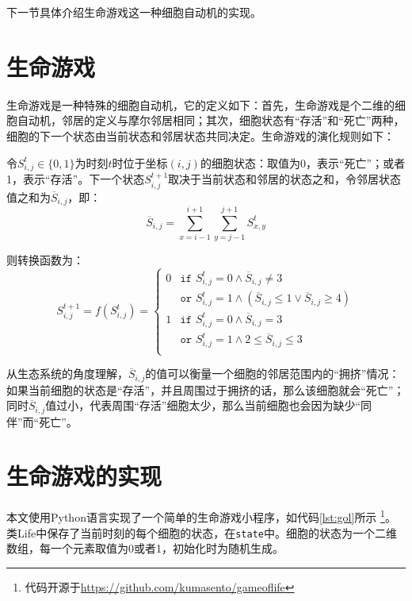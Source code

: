 \documentclass[a4paper,12pt]{report}
\begin{document}
下一节具体介绍生命游戏这一种细胞自动机的实现。

\section{生命游戏}\label{sec:gol}

生命游戏是一种特殊的细胞自动机，它的定义如下：首先，生命游戏是个二维的细胞自动机，邻居的定义与摩尔邻居相同；其次，细胞状态有“存活”和“死亡”两种，细胞的下一个状态由当前状态和邻居状态共同决定。生命游戏的演化规则如下：

令$S_{i,j}^t \in \{ 0, 1 \}$为时刻$t$时位于坐标$(i,j)$的细胞状态：取值为0，表示“死亡”；或者1，表示“存活”。下一个状态$S_{i,j}^{t+1}$取决于当前状态和邻居的状态之和，令邻居状态值之和为$\overline{S}_{i,j}$，即：
$$
\overline{S}_{i,j} = \sum_{x=i-1}^{i+1} \sum_{y=j-1}^{j+1} S_{x,y}^t 
$$

则转换函数为：
\begin{equation}\label{eq:mapping}
S_{i,j}^{t+1} = f(S_{i,j}^t) = 
\begin{cases}
0 & \texttt{if } S_{i,j}^t = 0 \wedge  \overline{S}_{i,j} \neq 3 \\
  & \texttt{or } S_{i,j}^t = 1 \wedge (\overline{S}_{i,j} \leq 1 \vee \overline{S}_{i,j} \geq 4) \\
1 & \texttt{if } S_{i,j}^t = 0 \wedge \overline{S}_{i,j} = 3 \\
  & \texttt{or } S_{i,j}^t = 1 \wedge 2 \leq \overline{S}_{i,j} \leq 3 \\
\end{cases}
\end{equation}

从生态系统的角度理解，$\overline{S}_{i,j}$的值可以衡量一个细胞的邻居范围内的“拥挤”情况：如果当前细胞的状态是“存活”，并且周围过于拥挤的话，那么该细胞就会“死亡”；同时$\overline{S}_{i,j}$值过小，代表周围“存活”细胞太少，那么当前细胞也会因为缺少“同伴”而“死亡”。

\section{生命游戏的实现}

本文使用Python语言实现了一个简单的生命游戏小程序，如代码\ref{lst:gol}所示
\footnote{代码开源于\url{https://github.com/kumasento/gameoflife}}。类Life中保存了当前时刻的每个细胞的状态，在\texttt{state}中。细胞的状态为一个二维数组，每一个元素取值为0或者1，初始化时为随机生成。
\singlespacing
{}
\onehalfspacing
\end{document}
